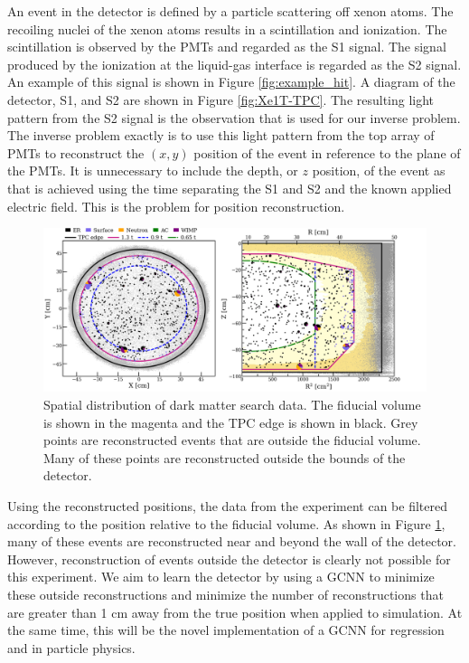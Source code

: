 \documentclass[thesis.tex]{subfiles}
\begin{document}
\par An event in the detector is defined by a particle scattering off xenon atoms.
The recoiling nuclei of the xenon atoms results in a scintillation and ionization.
The scintillation is observed by the PMTs and regarded as the S1 signal.
The signal produced by the ionization at the liquid-gas interface is regarded as the S2 signal.
An example of this signal is shown in Figure \ref{fig:example_hit}.
A diagram of the detector, S1, and S2 are shown in Figure \ref{fig:Xe1T-TPC}.
The resulting light pattern from the S2 signal is the observation that is used for our inverse problem.
The inverse problem exactly is to use this light pattern from the top array of PMTs to reconstruct the $(x, y)$ position of the event in reference to the plane of the PMTs.
It is unnecessary to include the depth, or $z$ position, of the event as that is achieved using the time separating the S1 and S2 and the known applied electric field.
This is the problem for position reconstruction.

\begin{figure}[t]
	\centering
	\includegraphics[width=\linewidth]{figures/reconstruction_distribution.png}
	\caption{
	Spatial distribution of dark matter search data.
	The fiducial volume is shown in the magenta and the TPC edge is shown in black.
	Grey points are reconstructed events that are outside the fiducial volume.
	Many of these points are reconstructed outside the bounds of the detector.
	\cite{Xe1T-YearExpo}
	}
	\label{fig:reco-distro}
\end{figure}
\par Using the reconstructed positions, the data from the experiment can be filtered according to the position relative to the fiducial volume.
As shown in Figure \ref{fig:reco-distro}, many of these events are reconstructed near and beyond the wall of the detector.
However, reconstruction of events outside the detector is clearly not possible for this experiment.
We aim to learn the detector by using a GCNN to minimize these outside reconstructions and minimize the number of reconstructions that are greater than 1 cm away from the true position when applied to simulation.
At the same time, this will be the novel implementation of a GCNN for regression and in particle physics.
\end{document}
